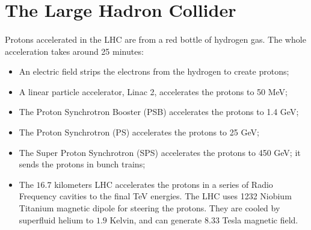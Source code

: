 \section{The Large Hadron Collider}
\label{sec:LHC}
\paragraph{}
Protons accelerated in the LHC are from a red bottle of hydrogen gas. The whole acceleration takes around 25 minutes:
\begin{itemize}
\item An electric field strips the electrons from the hydrogen to create protons; 
\item A linear particle accelerator, Linac 2, accelerates the protons to 50 MeV; 
\item The Proton Synchrotron Booster (PSB) accelerates the protons to 1.4 GeV;
\item The Proton Synchrotron (PS) accelerates the protons to 25 GeV; 
\item The Super Proton Synchrotron (SPS) accelerates the protons to 450 GeV; it sends the protons in bunch trains;
\item The $16.7$ kilometers LHC accelerates the protons in a series of Radio Frequency cavities to the final TeV energies. The LHC uses 1232 Niobium Titanium magnetic dipole for steering the protons. They are cooled by superfluid helium to $1.9$ Kelvin, and can generate $8.33$ Tesla magnetic field.
\end{itemize}

